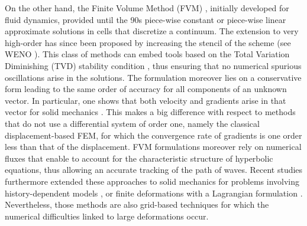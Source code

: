 On the other hand, the Finite Volume Method (FVM) \cite{Leveque}, initially developed for fluid dynamics, provided until the 90s piece-wise constant or piece-wise linear approximate solutions in cells that discretize a continuum.
The extension to very high-order has since been proposed by increasing the stencil of the scheme (see WENO \cite{WENO}).
This class of methods can embed tools based on the Total Variation Diminishing (TVD) stability condition \cite{Harten}, thus ensuring that no numerical spurious oscillations arise in the solutions. 
The formulation moreover lies on a conservative form leading to the same order of accuracy for all components of an unknown vector.
In particular, one shows that both velocity and gradients arise in that vector for solid mechanics \cite{Lee_FVM}.
This makes a big difference with respect to methods that do not use a differential system of order one, namely the classical displacement-based FEM, for which the convergence rate of gradients is one order less than that of the displacement.
FVM formulations moreover rely on numerical fluxes that enable to account for the characteristic structure of hyperbolic equations, thus allowing an accurate tracking of the path of waves.
Recent studies furthermore extended these approaches to solid mechanics for problems involving history-dependent models \cite{Gavrilyuk,Thomas_EP}, or finite deformations with a Lagrangian formulation \cite{Lee_FVM,Haider_FVM}.
Nevertheless, those methods are also grid-based techniques for which the numerical difficulties linked to large deformations occur.

